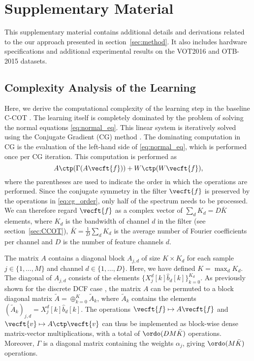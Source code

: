 \documentclass[10pt,twocolumn,letterpaper]{article}
\begin{document}
{\small


}

\clearpage


\section*{Supplementary Material}

This supplementary material contains additional details and derivations related to the our approach presented in section~\ref{sec:method}. It also includes hardware specifications and additional experimental results on the VOT2016 and OTB-2015 datasets.

\subsection*{Complexity Analysis of the Learning}
\label{sec:supp_complexity}

Here, we derive the computational complexity of the learning step in the baseline C-COT \cite{DanelljanECCV2016}. The learning itself is completely dominated by the problem of solving the normal equations \eqref{eq:normal_eq}.
This linear system is iteratively solved using the Conjugate Gradient (CG) method \cite{NumericalOptimization,CGpain}. The dominating computation in CG is the evaluation of the left-hand side of \eqref{eq:normal_eq}, which is performed once per CG iteration. This computation is performed as
\begin{equation}
\label{eq:cg_order}
A\ctp (\Gamma (A \vecft{f})) + W\ctp (W \vecft{f}),
\end{equation}
where the parentheses are used to indicate the order in which the operations are performed. Since the conjugate symmetry in the filter $\vecft{f}$ is preserved by the operations in \eqref{eq:cg_order}, only half of the spectrum needs to be processed. We can therefore regard $\vecft{f}$ as a complex vector of $\sum_d K_d = D \bar{K}$ elements, where $K_d$ is the bandwidth of channel $d$ in the filter (see section~\ref{sec:CCOT}), $\bar{K} = \frac{1}{D} \sum_d K_d$ is the average number of Fourier coefficients per channel and $D$ is the number of feature channels $d$.

The matrix $A$ contains a diagonal block $A_{j,d}$ of size $K \times K_d$ for each sample $j \in \{1, \ldots, M\}$ and channel $d \in \{1, \ldots, D\}$. Here, we have defined $K = \max_d K_d$. The diagonal of $A_{j,d}$ consists of the elements $\{X^d_j[k] \hat{b}_d[k]\}_{k=0}^{K_d}$. As previously shown for the discrete DCF case \cite{galoogahiICCV13}, the matrix $A$ can be permuted to a block diagonal matrix $\tilde{A} = \oplus_{k=0}^K \tilde{A}_k$, where $\tilde{A}_k$ contains the elements $(\tilde{A}_k)_{j,d} = X^d_j[k] \hat{b}_d[k]$. The operations $\vecft{f} \mapsto A \vecft{f}$ and $\vecft{v} \mapsto A\ctp \vecft{v}$ can thus be implemented as block-wise dense matrix-vector multiplications, with a total of $\ordo(D M \bar{K})$ operations. Moreover, $\Gamma$ is a diagonal matrix containing the weights $\alpha_j$, giving $\ordo(M \bar{K})$ operations.
\end{document}

